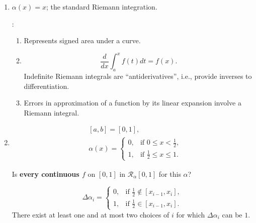 \documentclass[letterpaper, reqno,11pt]{article}
\begin{document}
\begin{enumerate}
\item $\alpha(x) = x$; the standard Riemann integration.

  :
  \begin{enumerate}
  \item Represents signed area under a curve.
  \item
    $$ \frac{d}{dx} \int_a^x f(t) dt = f(x). $$
    Indefinite Riemann integrals are ``antiderivatives'', i.e., provide inverses to differentiation.
  \item Errors in approximation of a function by its linear expansion involve a Riemann integral.
  \end{enumerate}
\item
  \begin{align*}
    & [a, b] = [0, 1], \\
    & \alpha(x) = \left\{
    \begin{array}{ll}
      0, & \text{if $0 \leq x < \frac{1}{2}$}, \\
      1, & \text{if $\frac{1}{2} \leq x \leq 1$}.
    \end{array}
    \right.
  \end{align*}

  \noindent Is {\bf every continuous $f$} on $[0, 1]$ in $\mathcal R_\alpha[0, 1]$ for this $\alpha$?

  \begin{figure}[H]
    \centering
  \end{figure}

  $$ \Delta \alpha_i = \left\{
  \begin{array}{ll}
    0, & \text{if $\frac{1}{2} \not \in [x_{i - 1}, x_i]$}, \\
    1, & \text{if $\frac{1}{2} \in [x_{i - 1}, x_i]$}.
  \end{array}
  \right. $$
   There exist at least one and at most two choices of $i$ for which $\Delta \alpha_i$ can be $1$.


\end{enumerate}
\end{document}
